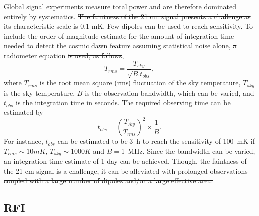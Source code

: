 Global signal experiments measure total power and are therefore dominated entirely by systematics. \st{The faintness of the 21 cm signal presents a challenge as its characteristic scale is 0.1 mK. Few dipoles can be used to reach sensitivity.}  To \st{include the order-of-magnitude} estimate \st{for} the amount of integration time needed to detect the cosmic dawn feature assuming statistical noise alone,  \st{a} radiometer equation \st{is used, as follows},
\begin{equation}
T_{rms} = \frac{T_{sky}}{\sqrt{B. t_{obs}}},
\end{equation}
where $T_{rms}$ is the root mean square (rms) fluctuation of the sky temperature, $T_{sky}$ is the sky temperature, $B$ is the observation bandwidth, which can be varied, and $t_{obs}$ is the integration time in seconds. 
The required observing time can be estimated by
\begin{equation}
t_{obs} = \left ({\frac{T_{sky}}{T_{rms}}} \right )^2 \times \frac{1}{B}.
\end{equation}
For instance, $t_{obs}$ can be estimated to be \SI{3}{\hour} to reach the sensitivity of \SI{100}{\milli \kelvin} if $T_{rms} \sim 10 mK$, $T_{sky} \sim 1000 K$ and $B=$\SI{1}{\mega \hertz}. \st{Since the bandwidth can be varied, an integration time estimate of 1 day can be achieved. Though, the faintness of the 21 cm signal is a challenge, it can be alleviated with prolonged observations coupled with a large number of dipoles and/or a large effective area.} 

\subsection*{RFI}

